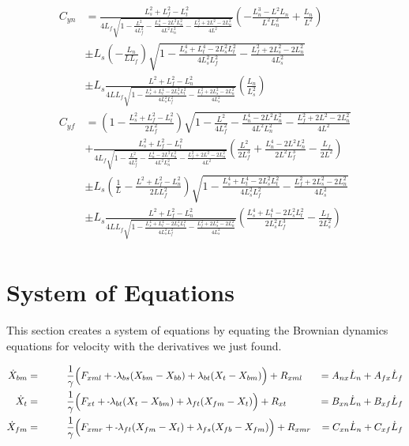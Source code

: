 \documentclass[11pt, landscape]{article}
\newcommand{\mn}{\scalebox{0.7}[1.0]{-}}
\begin{document}
\begin{align}
  C_{yn} &= \frac{L_{s}^2+L_f^2-L_{t}^2}{4L_f\sqrt{1 - \frac{L^2}{4L_f^2} - \frac{L_n^4 - 2L^2L_n^2}{4L^2L^2_{n}} - \frac{L_f^2 + 2L^2 - 2L_n^2}{4L^2}}}\left(-\frac{L_n^3 - L^2L_n}{L^2L^2_{n}} + \frac{L_n}{L^2}\right)\\
    &\pm L_s\left(-\frac{L_n}{LL_f}\right)\sqrt{1 - \frac{L_s^4 + L_t^4 - 2L_s^2L_t^2}{4L_s^2L_f^2} - \frac{L_f^2 + 2L_s^2 - 2L_n^2}{4L_s^2}}\\
    &\pm L_s\frac{L^2+L_f^2-L_n^2}{4LL_f\sqrt{1 - \frac{L_s^4 + L_t^4 - 2L_s^2L_t^2}{4L_s^2L_f^2} - \frac{L_f^2 + 2L_s^2 - 2L_n^2}{4L_s^2}}}\left(\frac{L_n}{L_s^2}\right)\\
  C_{yf} &= \left(1 - \frac{L_{s}^2+L_f^2-L_{t}^2}{2L_f^2}\right)\sqrt{1 - \frac{L^2}{4L_f^2} - \frac{L_n^4 - 2L^2L_n^2}{4L^2L^2_{n}} - \frac{L_f^2 + 2L^2 - 2L_n^2}{4L^2}}\\
    &+ \frac{L_{s}^2+L_f^2-L_{t}^2}{4L_f\sqrt{1 - \frac{L^2}{4L_f^2} - \frac{L_n^4 - 2L^2L_n^2}{4L^2L^2_{n}} - \frac{L_f^2 + 2L^2 - 2L_n^2}{4L^2}}}\left(\frac{L^2}{2L_f^3} + \frac{L_n^4 - 2L^2L_n^2}{2L^2L_f^3} - \frac{L_f}{2L^2}\right)\\
    &\pm L_s\left(\frac{1}{L} - \frac{L^2+L_f^2-L_n^2}{2LL_f^2}\right)\sqrt{1 - \frac{L_s^4 + L_t^4 - 2L_s^2L_t^2}{4L_s^2L_f^2} - \frac{L_f^2 + 2L_s^2 - 2L_n^2}{4L_s^2}}\\
    &\pm L_s\frac{L^2+L_f^2-L_n^2}{4LL_f\sqrt{1 - \frac{L_s^4 + L_t^4 - 2L_s^2L_t^2}{4L_s^2L_f^2} - \frac{L_f^2 + 2L_s^2 - 2L_n^2}{4L_s^2}}}\left(\frac{L_s^4 + L_t^4 - 2L_s^2L_t^2}{2L_s^2L_f^3} - \frac{L_f}{2L_s^2}\right)\\
\end{align}

\section{System of Equations}
This section creates a system of equations by equating the Brownian dynamics equations for velocity with the derivatives we just found.

\begin{align}  
  \dot{X}_{bm} = \hspace{1cm}& \frac{1}{\gamma} \Big(F_{xml} + \mn \lambda_{bs}(X_{bm} - X_{bb}) + \lambda_{bt}(X_{t } - X_{bm}) \Big) + R_{xml}  &= A_{nx}\dot{L}_n + A_{fx}\dot{L}_f\\
  \dot{X}_{t } = \hspace{1cm}& \frac{1}{\gamma} \Big(F_{xt } + \mn \lambda_{bt}(X_{t } - X_{bm}) + \lambda_{ft}(X_{fm} - X_{t }) \Big) + R_{xt } &= B_{xn}\dot{L}_n + B_{xf}\dot{L}_f\\
  \dot{X}_{fm} = \hspace{1cm}& \frac{1}{\gamma} \Big(F_{xmr} + \mn \lambda_{ft}(X_{fm} - X_{t }) + \lambda_{fs}(X_{fb} - X_{fm}) \Big) + R_{xmr} &= C_{xn}\dot{L}_n + C_{xf}\dot{L}_f
\end{align}
\end{document}
